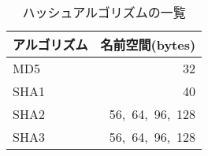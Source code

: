 \begin{table}[hbpt]
 \caption{ハッシュアルゴリズムの一覧}
 \centering
  \begin{tabular}{lr}
    \toprule
		\multicolumn{1}{c}{\textbf{アルゴリズム}} & \multicolumn{1}{c}{\textbf{名前空間(bytes)}} \\
    \midrule
		MD5 & 32\\
		SHA1 & 40 \\
		SHA2 & 56,\ 64,\ 96,\ 128\\
		SHA3 & 56,\ 64,\ 96,\ 128\\
    \bottomrule
  \end{tabular}
 \label{tab:hash-functions}
\end{table}
